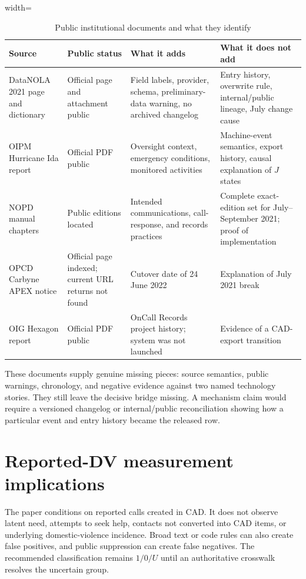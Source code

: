 \documentclass[11pt]{article}
\begin{document}
\begin{table}[!htbp]
\centering
\caption{Public institutional documents and what they identify}
\label{tab:institutions}
\begin{adjustbox}{width=\textwidth}
\begin{tabular}{@{}p{}p{}p{}p{}@{}}
\toprule
Source & Public status & What it adds & What it does not add \\
\midrule
DataNOLA 2021 page and dictionary & Official page and attachment public & Field labels, provider, schema, preliminary-data warning, no archived changelog & Entry history, overwrite rule, internal/public lineage, July change cause \\
OIPM Hurricane Ida report & Official PDF public & Oversight context, emergency conditions, monitored activities & Machine-event semantics, export history, causal explanation of $J$ states \\
NOPD manual chapters & Public editions located & Intended communications, call-response, and records practices & Complete exact-edition set for July--September 2021; proof of implementation \\
OPCD Carbyne APEX notice & Official page indexed; current URL returns not found & Cutover date of 24 June 2022 & Explanation of July 2021 break \\
OIG Hexagon report & Official PDF public & OnCall Records project history; system was not launched & Evidence of a CAD-export transition \\
\bottomrule
\end{tabular}
\end{adjustbox}
\end{table}

These documents supply genuine missing pieces: source semantics, public warnings, chronology, and negative evidence against two named technology stories. They still leave the decisive bridge missing. A mechanism claim would require a versioned changelog or internal/public reconciliation showing how a particular event and entry history became the released row.

\section{Reported-DV measurement implications}

The paper conditions on reported calls created in CAD. It does not observe latent need, attempts to seek help, contacts not converted into CAD items, or underlying domestic-violence incidence. Broad text or code rules can also create false positives, and public suppression can create false negatives. The recommended classification remains $1/0/U$ until an authoritative crosswalk resolves the uncertain group.
\end{document}
